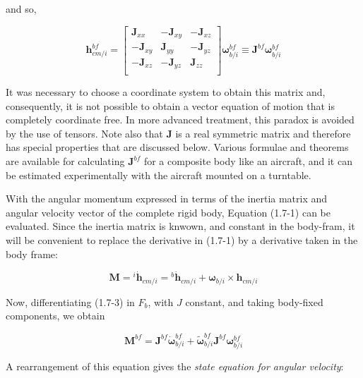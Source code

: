     and so,

    \begin{equation*}\tag{1.7-3}
        \mathbf{h}^{bf}_{cm/i} = \begin{bmatrix}
             \mathbf{J}_{xx} & -\mathbf{J}_{xy} & -\mathbf{J}_{xz} \\
            -\mathbf{J}_{xy} &  \mathbf{J}_{yy} & -\mathbf{J}_{yz} \\
            -\mathbf{J}_{xz} & -\mathbf{J}_{yz} &  \mathbf{J}_{zz} \\
        \end{bmatrix}
        \mathbf{\omega}^{bf}_{b/i} \equiv \mathbf{J}^{bf} \mathbf{\omega}^{bf}_{b/i}
    \end{equation*}

    It was necessary to choose a coordinate system to obtain this matrix and, consequently, it is not possible to obtain a vector equation of motion that is completely coordinate free. In more advanced treatment, this paradox is avoided by the use of tensors. Note also that \(\mathbf{J}\) is a real symmetric matrix and therefore has special properties that are discussed below. Various formulae and theorems are available for calculating \(\mathbf{J}^{bf}\) for a composite body like an aircraft, and it can be estimated experimentally with the aircraft mounted on a turntable.

    With the angular momentum expressed in terms of the inertia matrix and angular velocity vector of the complete rigid body, Equation (1.7-1) can be evaluated. Since the inertia matrix is knwown, and constant in the body-fram, it will be convenient to replace the derivative in (1.7-1) by a derivative taken in the body frame:

    \begin{equation*}\tag{1.7-4}
        \mathbf{M} = {^{i}{\dot{\mathbf{h}}_{cm/i}}} = {^{b}{\dot{\mathbf{h}}_{cm/i}}} + \mathbf{\omega}_{b/i} \times \mathbf{h}_{cm/i}
    \end{equation*}

    Now, differentiating (1.7-3) in \({F}_{b}\), with \(J\) constant, and taking body-fixed components, we obtain

    \begin{equation*}
        \mathbf{M}^{bf} = \mathbf{J}^{bf} {\dot{\mathbf{\omega}}^{bf}_{b/i}} + {\tilde{\mathbf{\omega}}}^{bf}_{b/i} \mathbf{J}^{bf} \mathbf{\omega}^{bf}_{b/i}
    \end{equation*}

    A rearrangement of this equation gives the \emph{state equation for angular velocity}:

